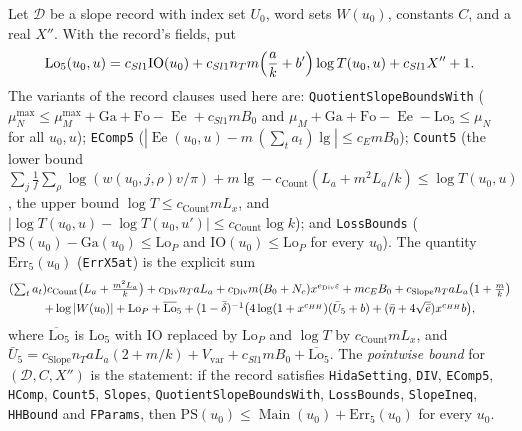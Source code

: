 \begin{definition}\label{geob:pointwise}
Let $\mathcal D$ be a slope record with index set $U_0$, word sets $W(u_0)$,
constants $C$, and a real $X''$. With the record's fields, put
\[
\mathrm{Lo}_5(u_0,u)=c_{Sl1}\mathrm{IO}(u_0)+c_{Sl1}n_Tm\Bigl(\frac ak+b'\Bigr)\log T(u_0,u)+c_{Sl1}X''+1 .
\]
The variants of the record clauses used here are: \texttt{QuotientSlopeBoundsWith}
($\mu_N^{\max}\le\mu_M^{\max}+\mathrm{Ga}+\mathrm{Fo}-\operatorname{Ee}+c_{Sl1}mB_0$ and
$\mu_M+\mathrm{Ga}+\mathrm{Fo}-\operatorname{Ee}-\mathrm{Lo}_5\le\mu_N$ for all
$u_0,u$); \texttt{EComp5}
($|\operatorname{Ee}(u_0,u)-m\,(\sum_ta_t)\lg|\le c_Em B_0$); \texttt{Count5}
(the lower bound
$\sum_j\frac1f\sum_{\rho}\log(w(u_0,j,\rho)v/\pi)+m\lg-c_{\mathrm{Count}}(L_a+m^2L_a/k)\le\log T(u_0,u)$,
the upper bound $\log T\le c_{\mathrm{Count}}mL_x$, and
$|\log T(u_0,u)-\log T(u_0,u')|\le c_{\mathrm{Count}}\log k$); and
\texttt{LossBounds} ($\mathrm{PS}(u_0)-\mathrm{Ga}(u_0)\le\mathrm{Lo}_P$ and
$\mathrm{IO}(u_0)\le\mathrm{Lo}_P$ for every $u_0$). The quantity
$\mathrm{Err}_5(u_0)$ (\texttt{ErrX5at}) is the explicit sum
\begin{multline*}
\textstyle(\sum_ta_t)c_{\mathrm{Count}}\bigl(L_a+\frac{m^2L_a}k\bigr)+c_{\mathrm{Div}}n_TaL_a+c_{\mathrm{Div}}m(B_0+N_c)x^{e_{\mathrm{Div}}\varepsilon}
+mc_EB_0+c_{\mathrm{Slope}}n_TaL_a\bigl(1+\frac mk\bigr)\\
\textstyle+\log|W(u_0)|+\mathrm{Lo}_P+\overline{\mathrm{Lo}}_5
+(1-\bar\delta)^{-1}\bigl(4\log(1+x^{c_{HH}})(\bar U_5+b)+(\bar\eta+4\sqrt{\bar e})x^{c_{HH}}b\bigr),
\end{multline*}
where $\overline{\mathrm{Lo}}_5$ is $\mathrm{Lo}_5$ with $\mathrm{IO}$ replaced by
$\mathrm{Lo}_P$ and $\log T$ by $c_{\mathrm{Count}}mL_x$, and
$\bar U_5=c_{\mathrm{Slope}}n_TaL_a(2+m/k)+V_{\mathrm{var}}+c_{Sl1}mB_0+\overline{\mathrm{Lo}}_5$.
The \emph{pointwise bound} for $(\mathcal D,C,X'')$ is the statement: if the
record satisfies \texttt{HidaSetting}, \texttt{DIV}, \texttt{EComp5},
\texttt{HComp}, \texttt{Count5}, \texttt{Slopes},
\texttt{QuotientSlopeBoundsWith}, \texttt{LossBounds}, \texttt{SlopeIneq},
\texttt{HHBound} and \texttt{FParams}, then
$\mathrm{PS}(u_0)\le\operatorname{Main}(u_0)+\mathrm{Err}_5(u_0)$ for every
$u_0$.
\end{definition}

